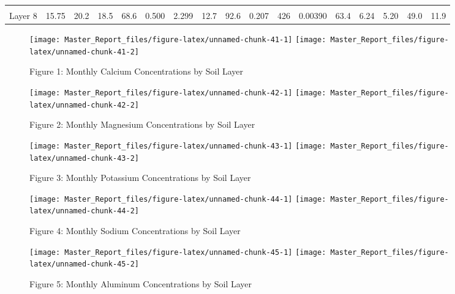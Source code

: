 \documentclass[
]{article}
\begin{document}
\begin{table}[!h]
{\begin{tabular}[t]{lllllllllllllllll}
\cellcolor{gray!6}{Layer 7} & \cellcolor{gray!6}{15.97} & \cellcolor{gray!6}{21.8} & \cellcolor{gray!6}{16.2} & \cellcolor{gray!6}{61.0} & \cellcolor{gray!6}{0.491} & \cellcolor{gray!6}{1.947} & \cellcolor{gray!6}{12.7} & \cellcolor{gray!6}{88.0} & \cellcolor{gray!6}{0.243} & \cellcolor{gray!6}{430} & \cellcolor{gray!6}{0.00499} & \cellcolor{gray!6}{61.1} & \cellcolor{gray!6}{7.62} & \cellcolor{gray!6}{5.12} & \cellcolor{gray!6}{48.4} & \cellcolor{gray!6}{13.0}\\
Layer 8 & 15.75 & 20.2 & 18.5 & 68.6 & 0.500 & 2.299 & 12.7 & 92.6 & 0.207 & 426 & 0.00390 & 63.4 & 6.24 & 5.20 & 49.0 & 11.9\\
\bottomrule
\end{tabular}}
\end{table}

\begin{figure}[H]
\texttt{[image: Master\_Report\_files/figure-latex/unnamed-chunk-41-1]} \texttt{[image: Master\_Report\_files/figure-latex/unnamed-chunk-41-2]} \caption{Figure 1: Monthly Calcium Concentrations by Soil Layer}\label{fig:unnamed-chunk-41}
\end{figure}
\begin{figure}[H]
\texttt{[image: Master\_Report\_files/figure-latex/unnamed-chunk-42-1]} \texttt{[image: Master\_Report\_files/figure-latex/unnamed-chunk-42-2]} \caption{Figure 2: Monthly Magnesium Concentrations by Soil Layer}\label{fig:unnamed-chunk-42}
\end{figure}
\begin{figure}[H]
\texttt{[image: Master\_Report\_files/figure-latex/unnamed-chunk-43-1]} \texttt{[image: Master\_Report\_files/figure-latex/unnamed-chunk-43-2]} \caption{Figure 3: Monthly Potassium Concentrations by Soil Layer}\label{fig:unnamed-chunk-43}
\end{figure}
\begin{figure}[H]
\texttt{[image: Master\_Report\_files/figure-latex/unnamed-chunk-44-1]} \texttt{[image: Master\_Report\_files/figure-latex/unnamed-chunk-44-2]} \caption{Figure 4: Monthly Sodium Concentrations by Soil Layer}\label{fig:unnamed-chunk-44}
\end{figure}

\begin{figure}[H]
\texttt{[image: Master\_Report\_files/figure-latex/unnamed-chunk-45-1]} \texttt{[image: Master\_Report\_files/figure-latex/unnamed-chunk-45-2]} \caption{Figure 5: Monthly Aluminum Concentrations by Soil Layer}\label{fig:unnamed-chunk-45}
\end{figure}
\end{document}
